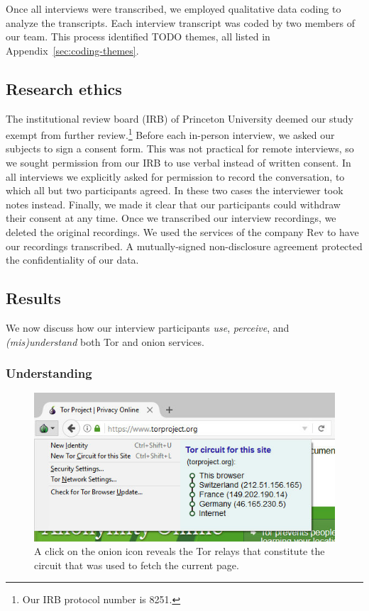 Once all interviews were transcribed, we employed qualitative data coding to
analyze the transcripts.  Each interview transcript was coded by two members of
our team.  This process identified TODO themes, all listed in
Appendix~\ref{sec:coding-themes}.

\subsection{Research ethics}

The institutional review board (IRB) of Princeton University deemed our study
exempt from further review.\footnote{Our IRB protocol number is 8251.}  Before
each in-person interview, we asked our subjects to sign a consent form.  This
was not practical for remote interviews, so we sought permission from our IRB
to use verbal instead of written consent.  In all interviews we explicitly
asked for permission to record the conversation, to which all but two
participants agreed.  In these two cases the interviewer took notes instead.
Finally, we made it clear that our participants could withdraw their consent at
any time.  Once we transcribed our interview recordings, we deleted the
original recordings.  We used the services of the company Rev to have our
recordings transcribed.  A mutually-signed non-disclosure agreement protected
the confidentiality of our data.

\subsection{Results}

We now discuss how our interview participants \emph{use}, \emph{perceive}, and
\emph{(mis)understand} both Tor and onion services.

\subsubsection{Understanding}

\begin{figure}[t]
    \centering
    \includegraphics[width=\linewidth]{figures/tor-button-screenshot.jpg}
    \caption{A click on the onion icon reveals the Tor relays that constitute
    the circuit that was used to fetch the current page.}
    \label{fig:tor-button}
\end{figure}

